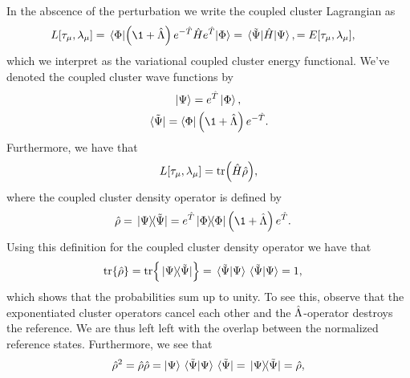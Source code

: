            In the abscence of the perturbation we write the coupled cluster
            Lagrangian as
            \begin{align}
                L[\clustamp_{\mu}, \clustlamp_{\mu}]
                &= \mel{\slat}{
                    \para{\1 + \clustl}
                    e^{-\clust}
                    \hamil
                    e^{\clust}
                }{\slat}
                = \mel*{\tilde{\Psi}}{\hamil}{\Psi},
                = E[\clustamp_{\mu}, \clustlamp_{\mu}],
                \label{eq:cc-energy-functional}
            \end{align}
            which we interpret as the variational coupled cluster energy
            functional.
            We've denoted the coupled cluster wave functions by
            \begin{gather}
                \ket{\Psi} = e^{\clust}\ket{\slat}, \\
                \bra*{\tilde{\Psi}} = \bra{\slat}\para{\1 + \clustl}e^{-\clust}.
            \end{gather}
            Furthermore, we have that
            \begin{align}
                L[\tau_{\mu}, \lambda_{\mu}]
                = \tr(\hat{H}\hat{\rho}),
            \end{align}
            where the coupled cluster density operator is defined by
            \cite{kvaal2013variational}
            \begin{align}
                \density
                &= \dyad*{\Psi}{\tilde{\Psi}}
                = e^{\clust}\dyad{\slat}{\slat}\para{\1 + \clustl}e^{\clust}.
                \label{eq:cc-density-operator}
            \end{align}
            Using this definition for the coupled cluster density operator we
            have that
            \begin{align}
                \tr{\density}
                &= \tr{\dyad*{\Psi}{\tilde{\Psi}}}
                = \bra*{\tilde{\Psi}}\ket{\Psi}
                \bra*{\tilde{\Psi}}\ket{\Psi}
                = 1,
            \end{align}
            which shows that the probabilities sum up to unity.
            To see this, observe that the exponentiated cluster operators cancel
            each other and the $\hat{\Lambda}$-operator destroys the reference.
            We are thus left left with the overlap between the normalized
            reference states.
            Furthermore, we see that
            \begin{align}
                \density^2
                = \density\density
                = \ket{\Psi}\braket*{\tilde{\Psi}}{\Psi}
                \bra*{\tilde{\Psi}}
                = \dyad*{\Psi}{\tilde{\Psi}}
                = \density,
            \end{align}
